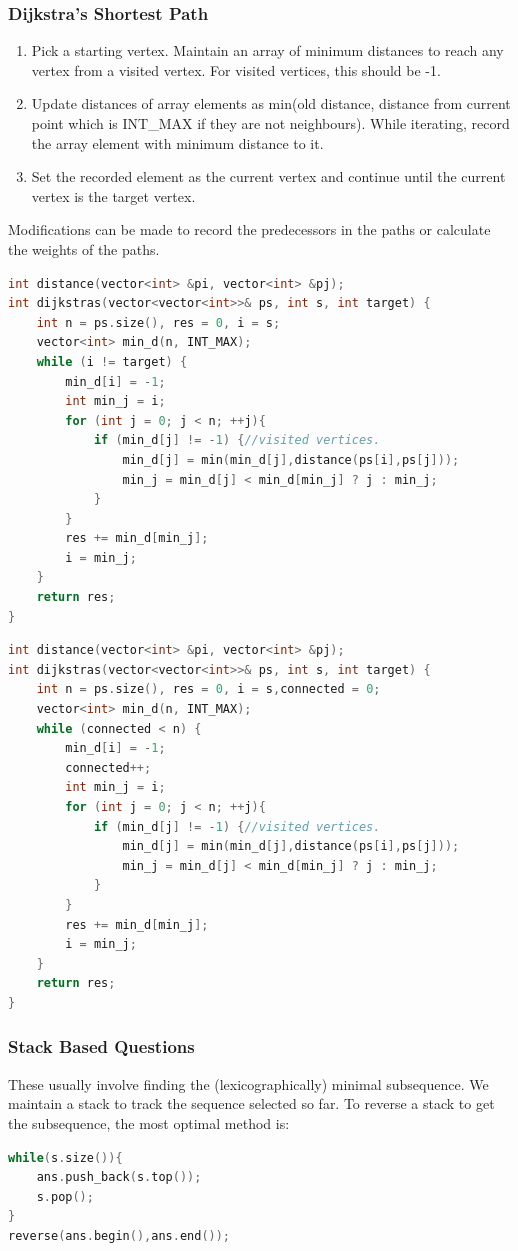 \documentclass{report}
\begin{document}
\subsubsection*{Dijkstra's Shortest Path}
\begin{enumerate}
    \item Pick a starting vertex. Maintain an array of minimum distances to reach any vertex from a visited vertex. For visited vertices, this should be -1.
    \item Update distances of array elements as min(old distance, distance from current point which is INT\_MAX if they are not neighbours). While iterating, record the array element with minimum distance to it. 
    \item Set the recorded element as the current vertex and continue until the current vertex is the target vertex.
\end{enumerate}
Modifications can be made to record the predecessors in the paths
or calculate the weights of the paths.
\begin{lstlisting}[language=C++,caption=Shortest Path]
int distance(vector<int> &pi, vector<int> &pj);
int dijkstras(vector<vector<int>>& ps, int s, int target) {
    int n = ps.size(), res = 0, i = s;
    vector<int> min_d(n, INT_MAX);
    while (i != target) {
        min_d[i] = -1;
        int min_j = i;
        for (int j = 0; j < n; ++j){
            if (min_d[j] != -1) {//visited vertices.
                min_d[j] = min(min_d[j],distance(ps[i],ps[j]));
                min_j = min_d[j] < min_d[min_j] ? j : min_j;
            }
        }
        res += min_d[min_j];
        i = min_j;
    }
    return res;
}
\end{lstlisting}
\begin{lstlisting}[language=C++,caption=Dijkstra's MST]
int distance(vector<int> &pi, vector<int> &pj);
int dijkstras(vector<vector<int>>& ps, int s, int target) {
    int n = ps.size(), res = 0, i = s,connected = 0;
    vector<int> min_d(n, INT_MAX);
    while (connected < n) {
        min_d[i] = -1;
        connected++;
        int min_j = i;
        for (int j = 0; j < n; ++j){
            if (min_d[j] != -1) {//visited vertices.
                min_d[j] = min(min_d[j],distance(ps[i],ps[j]));
                min_j = min_d[j] < min_d[min_j] ? j : min_j;
            }
        }
        res += min_d[min_j];
        i = min_j;
    }
    return res;
}
\end{lstlisting}
\subsubsection*{Stack Based Questions}
These usually involve finding the (lexicographically) minimal
subsequence. We maintain a stack to track the sequence
selected so far. To reverse a stack to get the subsequence, the
most optimal method is:
\begin{lstlisting}[language=C++]
while(s.size()){
    ans.push_back(s.top());
    s.pop();
}
reverse(ans.begin(),ans.end());
\end{lstlisting}
\end{document}

